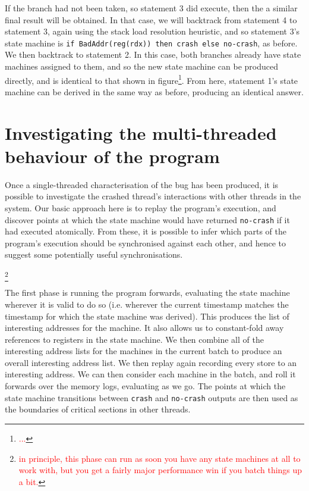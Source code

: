 \documentclass[10pt,twocolumn,preprint,natbib,authoryear]{sigplanconf}
\newcommand{\editorial}[1]{\textcolor{red}{\footnote{\textcolor{red}{#1}}}}
\begin{document}
If the branch had not been taken, so statement 3 did execute, then the
a similar final result will be obtained.  In that case, we will
backtrack from statement 4 to statement 3, again using the stack load
resolution heuristic, and so statement 3's state machine is
\verb|if BadAddr(reg(rdx)) then crash else no-crash|, as before.  We
then backtrack to statement 2.  In this case, both branches already
have state machines assigned to them, and so the new state machine can
be produced directly, and is identical to that shown in
figure\editorial{...}.  From here, statement 1's state machine can be
derived in the same way as before, producing an identical answer.

\section{Investigating the multi-threaded behaviour of the program}

Once a single-threaded characterisation of the bug has been produced,
it is possible to investigate the crashed thread's interactions with
other threads in the system.  Our basic approach here is to replay the
program's execution, and discover points at which the state machine
would have returned \verb|no-crash| if it had executed atomically.
From these, it is possible to infer which parts of the program's
execution should be synchronised against each other, and hence to
suggest some potentially useful synchronisations.

\editorial{in principle, this phase can run as soon you have any state
  machines at all to work with, but you get a fairly major performance
  win if you batch things up a bit.}

The first phase is running the program forwards, evaluating the state
machine wherever it is valid to do so (i.e. wherever the current
timestamp matches the timestamp for which the state machine was
derived).  This produces the list of interesting addresses for the
machine.  It also allows us to constant-fold away references to
registers in the state machine.  We then combine all of the
interesting address lists for the machines in the current batch to
produce an overall interesting address list.  We then replay again
recording every store to an interesting address.  We can then consider
each machine in the batch, and roll it forwards over the memory logs,
evaluating as we go.  The points at which the state machine
transitions between \verb|crash| and \verb|no-crash| outputs are then
used as the boundaries of critical sections in other threads.
\end{document}
